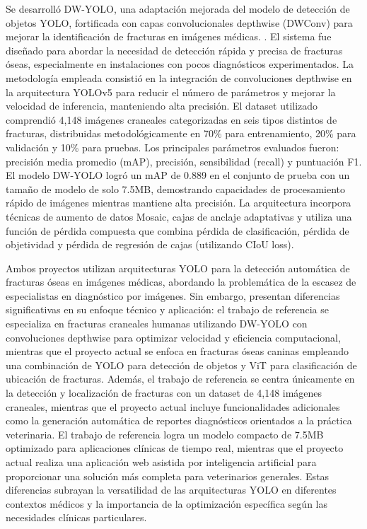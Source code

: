 { Se desarrolló DW-YOLO, una adaptación mejorada del modelo de detección de objetos YOLO, fortificada con capas convolucionales depthwise (DWConv) para mejorar la identificación de fracturas en imágenes médicas. \cite{liu2024}. El sistema fue diseñado para abordar la necesidad de detección rápida y precisa de fracturas óseas, especialmente en instalaciones con pocos diagnósticos experimentados. La metodología empleada consistió en la integración de convoluciones depthwise en la arquitectura YOLOv5 para reducir el número de parámetros y mejorar la velocidad de inferencia, manteniendo alta precisión. El dataset utilizado comprendió 4,148 imágenes craneales categorizadas en seis tipos distintos de fracturas, distribuidas metodológicamente en 70\% para entrenamiento, 20\% para validación y 10\% para pruebas. Los principales parámetros evaluados fueron: precisión media promedio (mAP), precisión, sensibilidad (recall) y puntuación F1. El modelo DW-YOLO logró un mAP de 0.889 en el conjunto de prueba con un tamaño de modelo de solo 7.5MB, demostrando capacidades de procesamiento rápido de imágenes mientras mantiene alta precisión. La arquitectura incorpora técnicas de aumento de datos Mosaic, cajas de anclaje adaptativas y utiliza una función de pérdida compuesta que combina pérdida de clasificación, pérdida de objetividad y pérdida de regresión de cajas (utilizando CIoU loss).

Ambos proyectos utilizan arquitecturas YOLO para la detección automática de fracturas óseas en imágenes médicas, abordando la problemática de la escasez de especialistas en diagnóstico por imágenes. Sin embargo, presentan diferencias significativas en su enfoque técnico y aplicación: el trabajo de referencia se especializa en fracturas craneales humanas utilizando DW-YOLO con convoluciones depthwise para optimizar velocidad y eficiencia computacional, mientras que el proyecto actual se enfoca en fracturas óseas caninas empleando una combinación de YOLO para detección de objetos y ViT para clasificación de ubicación de fracturas. Además, el trabajo de referencia se centra únicamente en la detección y localización de fracturas con un dataset de 4,148 imágenes craneales, mientras que el proyecto actual incluye funcionalidades adicionales como la generación automática de reportes diagnósticos orientados a la práctica veterinaria. El trabajo de referencia logra un modelo compacto de 7.5MB optimizado para aplicaciones clínicas de tiempo real, mientras que el proyecto actual realiza una aplicación web  asistida por inteligencia artificial para proporcionar una solución más completa para veterinarios generales. Estas diferencias subrayan la versatilidad de las arquitecturas YOLO en diferentes contextos médicos y la importancia de la optimización específica según las necesidades clínicas particulares.

}
